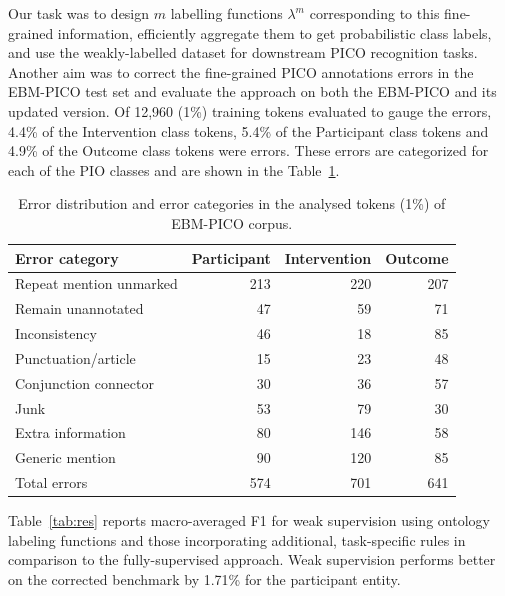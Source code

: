 \documentclass[10.7pt,]{article}
\begin{document}
%
%
%
Our task was to design $m$ labelling functions $\lambda^{m}$ corresponding to this fine-grained information, efficiently aggregate them to get probabilistic class labels, and use the weakly-labelled dataset for downstream PICO recognition tasks.
Another aim was to correct the fine-grained PICO annotations errors in the EBM-PICO test set and evaluate the approach on both the EBM-PICO and its updated version.
%
Of 12,960 (1\%) training tokens evaluated to gauge the errors, 4.4\% of the Intervention class tokens, 5.4\% of the Participant class tokens and 4.9\% of the Outcome class tokens were errors.
These errors are categorized for each of the PIO classes and are shown in the Table~\ref{tab:errordist}.
%

\begin{table}[!ht]
    \centering
    \begin{tabular}{|l|r|r|r|}
    \hline
        Error category & Participant & Intervention & Outcome \\ \hline
        Repeat mention unmarked & 213 & 220 & 207 \\ 
        Remain unannotated & 47 & 59 & 71 \\ 
        Inconsistency & 46 & 18 & 85 \\ 
        Punctuation/article & 15 & 23 & 48 \\ 
        Conjunction connector & 30 & 36 & 57 \\ 
        Junk & 53 & 79 & 30 \\ 
        Extra information & 80 & 146 & 58 \\ 
        Generic mention & 90 & 120 & 85 \\ \hline
        Total errors & 574 & 701 & 641 \\ \hline
    \end{tabular}
    \caption{\label{tab:errordist} Error distribution and error categories in the analysed tokens (1\%) of EBM-PICO corpus.}
\end{table}

%


Table~\ref{tab:res} reports macro-averaged F1 for weak supervision using ontology labeling functions and those incorporating additional, task-specific rules in comparison to the fully-supervised approach.
Weak supervision performs better on the corrected benchmark by 1.71\% for the participant entity. 
\end{document}
